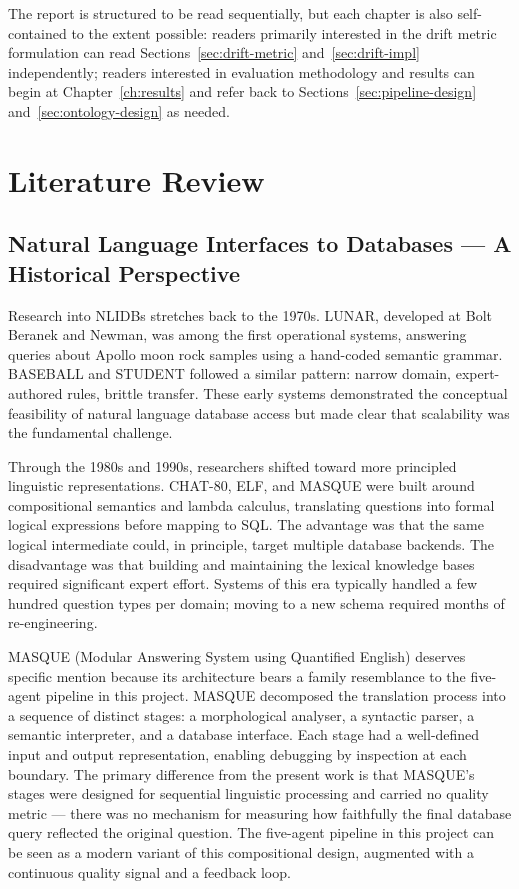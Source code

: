 \documentclass[12pt,a4paper]{report}
\begin{document}
The report is structured to be read sequentially, but each chapter is also self-contained to the extent possible: readers primarily interested in the drift metric formulation can read Sections~\ref{sec:drift-metric} and~\ref{sec:drift-impl} independently; readers interested in evaluation methodology and results can begin at Chapter~\ref{ch:results} and refer back to Sections~\ref{sec:pipeline-design} and~\ref{sec:ontology-design} as needed.

\chapter{Literature Review}
\label{ch:literature}

\section{Natural Language Interfaces to Databases --- A Historical Perspective}
\label{sec:nlidb-history}

Research into \acp{NLIDB} stretches back to the 1970s. LUNAR, developed at Bolt Beranek and Newman, was among the first operational systems, answering queries about Apollo moon rock samples using a hand-coded semantic grammar. BASEBALL and STUDENT followed a similar pattern: narrow domain, expert-authored rules, brittle transfer. These early systems demonstrated the conceptual feasibility of natural language database access but made clear that scalability was the fundamental challenge.

Through the 1980s and 1990s, researchers shifted toward more principled linguistic representations. CHAT-80, ELF, and MASQUE were built around compositional semantics and lambda calculus, translating questions into formal logical expressions before mapping to \ac{SQL}. The advantage was that the same logical intermediate could, in principle, target multiple database backends. The disadvantage was that building and maintaining the lexical knowledge bases required significant expert effort. Systems of this era typically handled a few hundred question types per domain; moving to a new schema required months of re-engineering.

MASQUE (Modular Answering System using Quantified English) deserves specific mention because its architecture bears a family resemblance to the five-agent pipeline in this project. MASQUE decomposed the translation process into a sequence of distinct stages: a morphological analyser, a syntactic parser, a semantic interpreter, and a database interface. Each stage had a well-defined input and output representation, enabling debugging by inspection at each boundary. The primary difference from the present work is that MASQUE's stages were designed for sequential linguistic processing and carried no quality metric — there was no mechanism for measuring how faithfully the final database query reflected the original question. The five-agent pipeline in this project can be seen as a modern variant of this compositional design, augmented with a continuous quality signal and a feedback loop.
\end{document}

